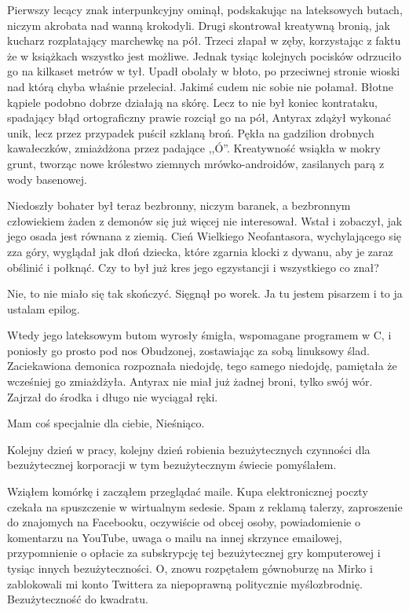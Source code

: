 Pierwszy lecący znak interpunkcyjny ominął, podskakując na lateksowych butach, niczym akrobata nad wanną krokodyli. 
Drugi skontrował kreatywną bronią, jak kucharz rozplatający marchewkę na pół.
Trzeci złapał w zęby, korzystając z faktu że w książkach wszystko jest możliwe.
Jednak tysiąc kolejnych pocisków odrzuciło go na kilkaset metrów w tył.
Upadł obolały w błoto, po przeciwnej stronie wioski nad którą chyba właśnie przeleciał. Jakimś cudem nic sobie nie połamał. Błotne kąpiele podobno dobrze działają na skórę.
Lecz to nie był koniec kontrataku, spadający błąd ortograficzny prawie rozciął go na pół, Antyrax zdążył wykonać unik, lecz przez przypadek puścił szklaną broń. 
Pękła na gadzilion drobnych kawałeczków, zmiażdżona przez padające ,,Ó''.
Kreatywność wsiąkła w mokry grunt, tworząc nowe królestwo ziemnych mrówko-androidów, zasilanych parą z wody basenowej.

Niedoszły bohater był teraz bezbronny, niczym baranek, a bezbronnym człowiekiem żaden z demonów się już więcej nie interesował. Wstał i zobaczył, jak jego osada jest równana z ziemią.
Cień Wielkiego Neofantasora, wychylającego się zza góry, wyglądał jak dłoń dziecka, które zgarnia klocki z dywanu, aby je zaraz obślinić i połknąć.
Czy to był już kres jego egzystancji i wszystkiego co znał?

\begin{dialogue}
\ds Nie, to nie miało się tak skończyć. \dm Sięgnął po worek. \dm Ja tu jestem pisarzem i to ja ustalam epilog. 
\end{dialogue}

Wtedy jego lateksowym butom wyrosły śmigła, wspomagane programem w C, i poniosły go prosto pod nos Obudzonej, zostawiając za sobą linuksowy ślad.
Zaciekawiona demonica rozpoznała niedojdę, tego samego niedojdę, pamiętała że wcześniej go zmiażdżyła.
Antyrax nie miał już żadnej broni, tylko swój wór. Zajrzał do środka i długo nie wyciągał ręki.
\begin{dialogue}
\ds{} Mam coś specjalnie dla ciebie, Nieśniąco.
\end{dialogue}

\divider{}

\begin{dialogue}
\ds{} Kolejny dzień w pracy, kolejny dzień robienia bezużytecznych czynności dla bezużytecznej korporacji w tym bezużytecznym świecie \dm{} pomyślałem.
\end{dialogue}

Wziąłem komórkę i zacząłem przeglądać maile. Kupa elektronicznej poczty czekała na spuszczenie w wirtualnym sedesie.
Spam z reklamą talerzy, zaproszenie do znajomych na Facebooku, oczywiście od obcej osoby, powiadomienie o komentarzu na YouTube,
uwaga o mailu na innej skrzynce emailowej, przypomnienie o opłacie za subskrypcję tej bezużytecznej gry komputerowej i tysiąc innych bezużyteczności.
O, znowu rozpętałem gównoburzę na Mirko i zablokowali mi konto Twittera za niepoprawną politycznie myślozbrodnię.
Bezużyteczność do kwadratu.

